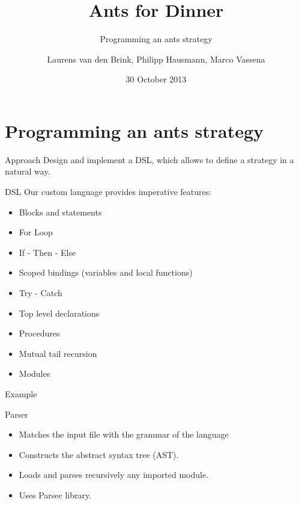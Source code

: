 \documentclass{beamer}
\title{Ants for Dinner}
\subtitle{Programming an ants strategy}
\author{Laurens van den Brink, Philipp Hausmann, Marco Vassena}
\date{30 October 2013}
\begin{document}
\begin{frame}
  \titlepage
\end{frame}


\section{Programming an ants strategy}
\begin{frame}{Approach}
	Design and implement a DSL, which allows to define a strategy in a natural way.
\end{frame}

\begin{frame}[fragile]{DSL}
	Our custom language provides imperative features:
	\begin{itemize}
		\item Blocks and statements
		\item For Loop
		\item If - Then - Else
		\item Scoped bindings (variables and local functions)
		\item Try - Catch
		\item Top level declarations
		\item Procedures
		\item Mutual tail recursion
		\item Modules
	\end{itemize}
\end{frame}


\begin{frame}
	\begin{block}{Example}
	\end{block}
\end{frame}


\begin{frame}{Parser}

	\begin{itemize}
		\item Matches the input file with the grammar of the language
		\item Constructs the abstract syntax tree (AST).
		\item Loads and parses recursively any imported module.
		\item Uses Parsec library.
	\end{itemize}
	
\end{frame}
\end{document}
